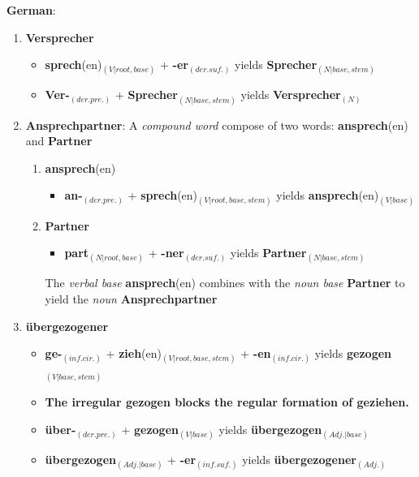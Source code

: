 \documentclass[11pt]{article}
\begin{document}
\begin{solution}
\newpage

\textbf{German}:
\begin{enumerate}
	\item \textbf{Versprecher}
		\begin{itemize}
			\item \textbf{sprech}(en)$_{(V|root, base)}$ + \textbf{-er}$_{(der. suf.)}$ yields \textbf{Sprecher}$_{(N|base, stem)}$
			\item \textbf{Ver-}$_{(der. pre.)}$ + \textbf{Sprecher}$_{(N|base, stem)}$ yields \textbf{Versprecher}$_{(N)}$
		\end{itemize}
	\item \textbf{Ansprechpartner}: A \textit{compound word} compose of two words: \textbf{ansprech}(en) and \textbf{Partner}
		\begin{enumerate}
			\item \textbf{ansprech}(en)
				\begin{itemize}
					\item \textbf{an-}$_{(der. pre.)}$ + \textbf{sprech}(en)$_{(V|root, base, stem)}$  yields \textbf{ansprech}(en)$_{(V|base)}$
				\end{itemize}
			\item \textbf{Partner}
				\begin{itemize}
					\item \textbf{part}$_{(N|root, base)}$ + \textbf{-ner}$_{(der. suf.)}$ yields \textbf{Partner}$_{(N|base, stem)}$
				\end{itemize}
			The \textit{verbal base} \textbf{ansprech}(en) combines with the \textit{noun base} \textbf{Partner} to yield the \textit{noun} \textbf{Ansprechpartner}
		\end{enumerate}
	\item \textbf{{\"u}bergezogener}
		\begin{itemize}
			\item \textbf{ge-}$_{(inf. cir.)}$ + \textbf{zieh}(en)$_{(V|root, base, stem)}$ + \textbf{-en}$_{(inf. cir.)}$ yields \textbf{gezogen}$_{(V|base, stem)}$
			\item \textbf{The irregular gezogen blocks the regular formation of geziehen.}
			\item \textbf{{\"u}ber-}$_{(der. pre.)}$ + \textbf{gezogen}$_{(V|base)}$  yields \textbf{{\"u}bergezogen}$_{(Adj.|base)}$
			\item \textbf{{\"u}bergezogen}$_{(Adj.|base)}$ + \textbf{-er}$_{(inf. suf.)}$ yields \textbf{{\"u}bergezogener}$_{(Adj.)}$
		\end{itemize}
\end{enumerate}
\end{solution}
\end{document}
